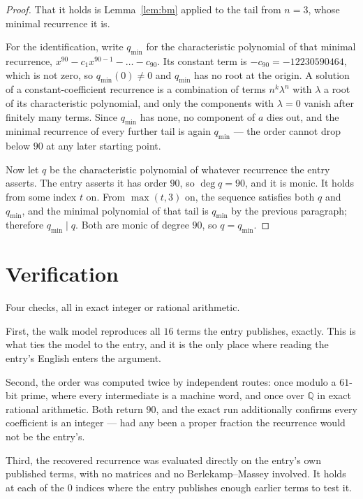 \documentclass[11pt,a4paper]{article}
\theoremstyle{plain}
\theoremstyle{definition}
\begin{document}
\begin{proof}
That it holds is Lemma~\ref{lem:bm} applied to the tail from $n=3$, whose minimal
recurrence it is.

For the identification, write $q_{\min}$ for the characteristic polynomial of that minimal
recurrence, $x^{90}-c_1x^{90-1}-\dots-c_{90}$. Its constant term is
$-c_{90}=-12230590464$, which is not zero, so $q_{\min}(0)\neq0$ and $q_{\min}$ has no
root at the origin. A solution of a constant-coefficient recurrence is a combination of terms
$n^{k}\lambda^{n}$ with $\lambda$ a root of its characteristic polynomial, and only the
components with $\lambda=0$ vanish after finitely many terms. Since $q_{\min}$ has none, no
component of $a$ dies out, and the minimal recurrence of every further tail is again
$q_{\min}$ --- the order cannot drop below $90$ at any later starting point.

Now let $q$ be the characteristic polynomial of whatever recurrence the entry asserts. The
entry asserts it has order $90$, so $\deg q=90$, and it is monic. It holds from some
index $t$ on. From $\max(t,3)$ on, the sequence satisfies both $q$ and $q_{\min}$, and
the minimal polynomial of that tail is $q_{\min}$ by the previous paragraph; therefore
$q_{\min}\mid q$. Both are monic of degree $90$, so $q=q_{\min}$.
\end{proof}

\section{Verification}

Four checks, all in exact integer or rational arithmetic.

First, the walk model reproduces all $16$ terms the entry publishes, exactly. This is
what ties the model to the entry, and it is the only place where reading the entry's English
enters the argument.

Second, the order was computed twice by independent routes: once modulo a $61$-bit prime, where
every intermediate is a machine word, and once over $\mathbb{Q}$ in exact rational arithmetic.
Both return $90$, and the exact run additionally confirms every coefficient is an integer
--- had any been a proper fraction the recurrence would not be the entry's.

Third, the recovered recurrence was evaluated directly on the entry's own published terms, with
no matrices and no Berlekamp--Massey involved. It holds at each of the $0$ indices where
the entry publishes enough earlier terms to test it.
\end{document}
